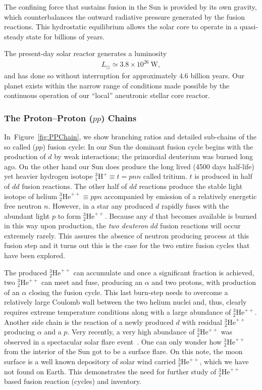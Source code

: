 \documentclass[particles,article,accept,pdftex,moreauthors]{Definitions/mdpi}
\begin{document}
The confining force that sustains fusion in the Sun is provided by its own gravity, which counterbalances the outward radiative pressure generated by the fusion reactions. This hydrostatic equilibrium allows the solar core to operate in a quasi-steady state for billions of years.

The present-day solar reactor generates a luminosity
\begin{align}
L_\odot \simeq 3.8\times10^{26}~\mathrm{W},
\end{align}
and has done so without interruption for approximately $4.6$ billion years. Our planet exists within the narrow range of conditions made possible by the continuous operation of our ``local'' aneutronic stellar core reactor.

\subsubsection{The Proton--Proton (\texorpdfstring{$pp$}{pp}) Chains}\label{sec:PPChains}

In~Figure~\ref{fig:PPChain}, we show branching ratios and detailed sub-chains of the so called ($pp$) fusion cycle: 
In our Sun the dominant fusion cycle begins with the production of $d$ by weak interactions; the primordial deuterium was burned long ago. On the other hand our Sun does produce the long lived (4500 days half-life) yet heavier hydrogen isotope ${}^{3}_{1}\mathrm{H}^+\equiv t=pnn$ called tritium. $t$ is produced in half of $dd$ fusion reactions. The other half of $dd$ reactions produce the stable light isotope of helium ${}^{3}_{2}\mathrm{He}^{++}\equiv ppn$ accompanied by emission of a relatively energetic free neutron $n$. However, in a star any produced $d$ rapidly fuses with the abundant light $p$ to form ${}^{3}_{2}\mathrm{He}^{++}$. Because any $d$ that becomes available is burned in this way upon production, the {\em two deuteron} $dd$ fusion reactions will occur extremely rarely. This assures the absence of neutron producing process at this fusion step and it turns out this is the case for the two entire fusion cycles that have been explored.

The produced ${}^{3}_{2}\mathrm{He}^{++}$ can accumulate and once a significant fraction is achieved, two ${}^{3}_{2}\mathrm{He}^{++}$ can meet and fuse, producing an $\alpha$ and two protons, with production of an $\alpha$ closing the fusion cycle. This last burn-step needs to overcome a relatively large Coulomb wall between the two helium nuclei and, thus, clearly requires extreme temperature conditions along with a large abundance of ${}^{3}_{2}\mathrm{He}^{++}$. Another side chain is the reaction of a newly produced $d$ with residual ${}^{3}_{2}\mathrm{He}^{++}$ producing $\alpha$ and a $p$. Very recently, a very high abundance of ${}^{3}_{2}\mathrm{He}^{++}$ was observed in a spectacular solar flare event~\cite{Bucik:2025}. One can only wonder how ${}^{3}_{2}\mathrm{He}^{++}$ from the interior of the Sun got to be a surface flare. On this note, the moon surface is a well known depository of solar wind carried ${}^{3}_{2}\mathrm{He}^{++}$, which we have not found on Earth. This demonstrates the need for further study of ${}^{3}_{2}\mathrm{He}^{++}$ based fusion reaction (cycles) and inventory.
\end{document}
